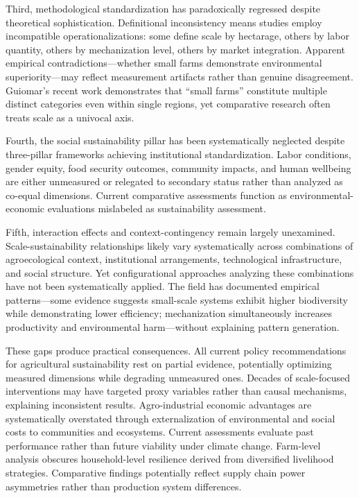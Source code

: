 \documentclass[12pt, a4paper]{article}
\begin{document}
Third, methodological standardization has paradoxically regressed despite theoretical sophistication. Definitional inconsistency means studies employ incompatible operationalizations: some define scale by hectarage, others by labor quantity, others by mechanization level, others by market integration. Apparent empirical contradictions---whether small farms demonstrate environmental superiority---may reflect measurement artifacts rather than genuine disagreement. Guiomar's recent work demonstrates that ``small farms'' constitute multiple distinct categories even within single regions, yet comparative research often treats scale as a univocal axis.

Fourth, the social sustainability pillar has been systematically neglected despite three-pillar frameworks achieving institutional standardization. Labor conditions, gender equity, food security outcomes, community impacts, and human wellbeing are either unmeasured or relegated to secondary status rather than analyzed as co-equal dimensions. Current comparative assessments function as environmental-economic evaluations mislabeled as sustainability assessment.

Fifth, interaction effects and context-contingency remain largely unexamined. Scale-sustainability relationships likely vary systematically across combinations of agroecological context, institutional arrangements, technological infrastructure, and social structure. Yet configurational approaches analyzing these combinations have not been systematically applied. The field has documented empirical patterns---some evidence suggests small-scale systems exhibit higher biodiversity while demonstrating lower efficiency; mechanization simultaneously increases productivity and environmental harm---without explaining pattern generation.

These gaps produce practical consequences. All current policy recommendations for agricultural sustainability rest on partial evidence, potentially optimizing measured dimensions while degrading unmeasured ones. Decades of scale-focused interventions may have targeted proxy variables rather than causal mechanisms, explaining inconsistent results. Agro-industrial economic advantages are systematically overstated through externalization of environmental and social costs to communities and ecosystems. Current assessments evaluate past performance rather than future viability under climate change. Farm-level analysis obscures household-level resilience derived from diversified livelihood strategies. Comparative findings potentially reflect supply chain power asymmetries rather than production system differences.
\end{document}
